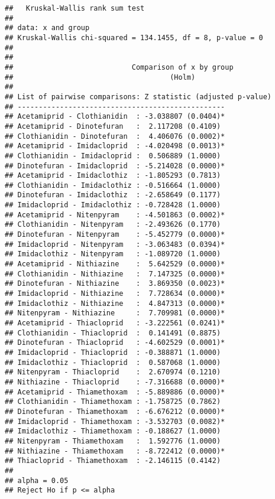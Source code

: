 \documentclass[]{article}
\begin{document}
\begin{verbatim}
##   Kruskal-Wallis rank sum test
## 
## data: x and group
## Kruskal-Wallis chi-squared = 134.1455, df = 8, p-value = 0
## 
## 
##                            Comparison of x by group                            
##                                     (Holm)                                     
## 
## List of pairwise comparisons: Z statistic (adjusted p-value)
## -------------------------------------------------
## Acetamiprid - Clothianidin  : -3.038807 (0.0404)*
## Acetamiprid - Dinotefuran   :  2.117208 (0.4109)
## Clothianidin - Dinotefuran  :  4.406076 (0.0002)*
## Acetamiprid - Imidacloprid  : -4.020498 (0.0013)*
## Clothianidin - Imidacloprid :  0.506889 (1.0000)
## Dinotefuran - Imidacloprid  : -5.214028 (0.0000)*
## Acetamiprid - Imidaclothiz  : -1.805293 (0.7813)
## Clothianidin - Imidaclothiz : -0.516664 (1.0000)
## Dinotefuran - Imidaclothiz  : -2.658649 (0.1177)
## Imidacloprid - Imidaclothiz : -0.728428 (1.0000)
## Acetamiprid - Nitenpyram    : -4.501863 (0.0002)*
## Clothianidin - Nitenpyram   : -2.493626 (0.1770)
## Dinotefuran - Nitenpyram    : -5.452779 (0.0000)*
## Imidacloprid - Nitenpyram   : -3.063483 (0.0394)*
## Imidaclothiz - Nitenpyram   : -1.089720 (1.0000)
## Acetamiprid - Nithiazine    :  5.642529 (0.0000)*
## Clothianidin - Nithiazine   :  7.147325 (0.0000)*
## Dinotefuran - Nithiazine    :  3.869350 (0.0023)*
## Imidacloprid - Nithiazine   :  7.728634 (0.0000)*
## Imidaclothiz - Nithiazine   :  4.847313 (0.0000)*
## Nitenpyram - Nithiazine     :  7.709981 (0.0000)*
## Acetamiprid - Thiacloprid   : -3.222561 (0.0241)*
## Clothianidin - Thiacloprid  :  0.141491 (0.8875)
## Dinotefuran - Thiacloprid   : -4.602529 (0.0001)*
## Imidacloprid - Thiacloprid  : -0.388871 (1.0000)
## Imidaclothiz - Thiacloprid  :  0.587068 (1.0000)
## Nitenpyram - Thiacloprid    :  2.670974 (0.1210)
## Nithiazine - Thiacloprid    : -7.316688 (0.0000)*
## Acetamiprid - Thiamethoxam  : -5.889886 (0.0000)*
## Clothianidin - Thiamethoxam : -1.758725 (0.7862)
## Dinotefuran - Thiamethoxam  : -6.676212 (0.0000)*
## Imidacloprid - Thiamethoxam : -3.532703 (0.0082)*
## Imidaclothiz - Thiamethoxam : -0.188627 (1.0000)
## Nitenpyram - Thiamethoxam   :  1.592776 (1.0000)
## Nithiazine - Thiamethoxam   : -8.722412 (0.0000)*
## Thiacloprid - Thiamethoxam  : -2.146115 (0.4142)
## 
## alpha = 0.05
## Reject Ho if p <= alpha
\end{verbatim}
\end{document}
